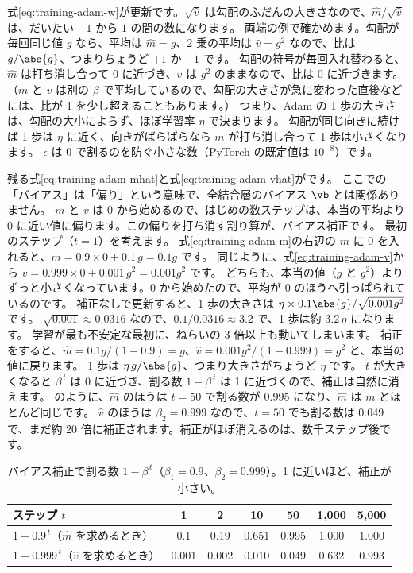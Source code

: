 式\eqref{eq:training-adam-w}が更新です。$\sqrt{\hat v}$ は勾配のふだんの大きさなので、$\hat m/\sqrt{\hat v}$ は、だいたい $-1$ から $1$ の間の数になります。
両端の例で確かめます。勾配が毎回同じ値 $g$ なら、平均は $\hat m=g$、2 乗の平均は $\hat v=g^2$ なので、比は $g/\abs{g}$、つまりちょうど $+1$ か $-1$ です。
勾配の符号が毎回入れ替わると、$\hat m$ は打ち消し合って 0 に近づき、$\hat v$ は $g^2$ のままなので、比は 0 に近づきます。
（$m$ と $v$ は別の $\beta$ で平均しているので、勾配の大きさが急に変わった直後などには、比が 1 を少し超えることもあります。）
つまり、Adam の 1 歩の大きさは、勾配の大小によらず、ほぼ学習率 $\eta$ で決まります。
勾配が同じ向きに続けば 1 歩は $\eta$ に近く、向きがばらばらなら $m$ が打ち消し合って 1 歩は小さくなります。
$\epsilon$ は 0 で割るのを防ぐ小さな数（PyTorch の既定値は $10^{-8}$）です。

残る式\eqref{eq:training-adam-mhat}と式\eqref{eq:training-adam-vhat}がです。
ここでの「バイアス」は「偏り」という意味で、全結合層のバイアス $\vb$ とは関係ありません。
$m$ と $v$ は 0 から始めるので、はじめの数ステップは、本当の平均より 0 に近い値に偏ります。この偏りを打ち消す割り算が、バイアス補正です。
最初のステップ（$t=1$）を考えます。
式\eqref{eq:training-adam-m}の右辺の $m$ に 0 を入れると、$m=0.9\times0+0.1\,g=0.1g$ です。
同じように、式\eqref{eq:training-adam-v}から $v=0.999\times0+0.001\,g^2=0.001g^2$ です。
どちらも、本当の値（$g$ と $g^2$）よりずっと小さくなっています。0 から始めたので、平均が 0 のほうへ引っぱられているのです。
補正なしで更新すると、1 歩の大きさは $\eta\times0.1\abs{g}/\sqrt{0.001g^2}$ です。
$\sqrt{0.001}\approx0.0316$ なので、$0.1/0.0316\approx3.2$ で、1 歩は約 $3.2\,\eta$ になります。
学習が最も不安定な最初に、ねらいの 3 倍以上も動いてしまいます。
補正をすると、$\hat m=0.1g/(1-0.9)=g$、$\hat v=0.001g^2/(1-0.999)=g^2$ と、本当の値に戻ります。
1 歩は $\eta\,g/\abs{g}$、つまり大きさがちょうど $\eta$ です。
$t$ が大きくなると $\beta^{\,t}$ は 0 に近づき、割る数 $1-\beta^{\,t}$ は 1 に近づくので、補正は自然に消えます。
のように、$\hat m$ のほうは $t=50$ で割る数が 0.995 になり、$\hat m$ は $m$ とほとんど同じです。
$\hat v$ のほうは $\beta_2=0.999$ なので、$t=50$ でも割る数は 0.049 で、まだ約 20 倍に補正されます。補正がほぼ消えるのは、数千ステップ後です。

\begin{table}[tbp]
\centering
\caption{バイアス補正で割る数 $1-\beta^{\,t}$（$\beta_1=0.9$、$\beta_2=0.999$）。1 に近いほど、補正が小さい。}
\label{tab:training-bias-correction}
\small
\begin{tabular}{lcccccc}
\toprule
ステップ $t$ & 1 & 2 & 10 & 50 & 1,000 & 5,000 \\
\midrule
$1-0.9^{\,t}$（$\hat m$ を求めるとき） & 0.1 & 0.19 & 0.651 & 0.995 & 1.000 & 1.000 \\
$1-0.999^{\,t}$（$\hat v$ を求めるとき） & 0.001 & 0.002 & 0.010 & 0.049 & 0.632 & 0.993 \\
\bottomrule
\end{tabular}
\end{table}

